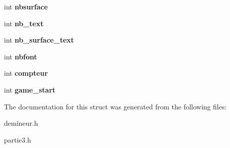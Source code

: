 \begin{DoxyCompactItemize}
\item 
\hypertarget{struct_context_a0f5f2d4801fb55f57f4c80a3c35c8746}{
int {\bfseries nbsurface}}
\label{struct_context_a0f5f2d4801fb55f57f4c80a3c35c8746}

\item 
\hypertarget{struct_context_adcb589f1121bc24029837ba4c2fa29df}{
int {\bfseries nb\_\-text}}
\label{struct_context_adcb589f1121bc24029837ba4c2fa29df}

\item 
\hypertarget{struct_context_a363c5996d6de16569cb3ba2f3d6c2ca8}{
int {\bfseries nb\_\-surface\_\-text}}
\label{struct_context_a363c5996d6de16569cb3ba2f3d6c2ca8}

\item 
\hypertarget{struct_context_aa13a58264ab063e5f78b94a8801ce4c2}{
int {\bfseries nbfont}}
\label{struct_context_aa13a58264ab063e5f78b94a8801ce4c2}

\item 
\hypertarget{struct_context_ade857a99d48bcb8cfaa57c4cd8d7d2e8}{
int {\bfseries compteur}}
\label{struct_context_ade857a99d48bcb8cfaa57c4cd8d7d2e8}

\item 
\hypertarget{struct_context_afd92ea61b06ada108973d80bc39591c2}{
int {\bfseries game\_\-start}}
\label{struct_context_afd92ea61b06ada108973d80bc39591c2}

\end{DoxyCompactItemize}


The documentation for this struct was generated from the following files:\begin{DoxyCompactItemize}
\item 
demineur.h\item 
partie3.h\end{DoxyCompactItemize}
